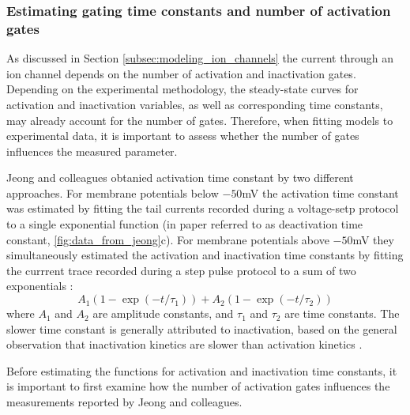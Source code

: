 \documentclass[../main.tex]{subfiles}
\begin{document}
\subsubsection{Estimating gating time constants and number of activation gates}

As discussed in Section \ref{subsec:modeling_ion_channels} the current through an ion channel depends on the number of activation and inactivation gates. Depending on the experimental methodology, the steady-state curves for activation and inactivation variables, as well as corresponding time constants, may already account for the number of gates. Therefore, when fitting models to experimental data, it is important to assess whether the number of gates influences the measured parameter.

Jeong and colleagues obtanied activation time constant by two different approaches. For membrane potentials below $-50$mV the activation time constant was estimated by fitting the tail currents recorded during a voltage-setp protocol to a single exponential function (in paper referred to as deactivation time constant, \ref{fig:data_from_jeong}c). 
For membrane potentials above $-50$mV they simultaneously estimated the activation and inactivation time constants by fitting the currrent trace recorded during a step pulse protocol to a sum of two exponentials \parencite{jeongCaa1TFlyTtype2015}:
\begin{equation}\label{eq:jeong_double_exponent}
    A_1(1 - \exp{(-t/\tau_1)}) + A_2(1 - \exp{(-t/\tau_2)})
\end{equation}
where $A_1$ and $A_2$ are amplitude constants, and $\tau_1$ and $\tau_2$ are time constants. The slower time constant is generally attributed to inactivation, based on the general observation that inactivation kinetics are slower than activation kinetics \parencite{izhikevichDynamicalSystemsNeuroscience2006}.

Before estimating the functions for activation and inactivation time constants, it is important to first examine how the number of activation gates influences the measurements reported by Jeong and colleagues.
\end{document}
